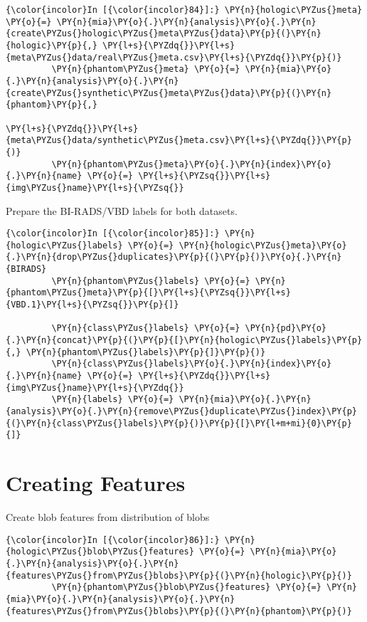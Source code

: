     \begin{Verbatim}[commandchars=\\\{\}]
{\color{incolor}In [{\color{incolor}84}]:} \PY{n}{hologic\PYZus{}meta} \PY{o}{=} \PY{n}{mia}\PY{o}{.}\PY{n}{analysis}\PY{o}{.}\PY{n}{create\PYZus{}hologic\PYZus{}meta\PYZus{}data}\PY{p}{(}\PY{n}{hologic}\PY{p}{,} \PY{l+s}{\PYZdq{}}\PY{l+s}{meta\PYZus{}data/real\PYZus{}meta.csv}\PY{l+s}{\PYZdq{}}\PY{p}{)}
         \PY{n}{phantom\PYZus{}meta} \PY{o}{=} \PY{n}{mia}\PY{o}{.}\PY{n}{analysis}\PY{o}{.}\PY{n}{create\PYZus{}synthetic\PYZus{}meta\PYZus{}data}\PY{p}{(}\PY{n}{phantom}\PY{p}{,}
                                                                \PY{l+s}{\PYZdq{}}\PY{l+s}{meta\PYZus{}data/synthetic\PYZus{}meta.csv}\PY{l+s}{\PYZdq{}}\PY{p}{)}
         \PY{n}{phantom\PYZus{}meta}\PY{o}{.}\PY{n}{index}\PY{o}{.}\PY{n}{name} \PY{o}{=} \PY{l+s}{\PYZsq{}}\PY{l+s}{img\PYZus{}name}\PY{l+s}{\PYZsq{}}
\end{Verbatim}

    Prepare the BI-RADS/VBD labels for both datasets.

    \begin{Verbatim}[commandchars=\\\{\}]
{\color{incolor}In [{\color{incolor}85}]:} \PY{n}{hologic\PYZus{}labels} \PY{o}{=} \PY{n}{hologic\PYZus{}meta}\PY{o}{.}\PY{n}{drop\PYZus{}duplicates}\PY{p}{(}\PY{p}{)}\PY{o}{.}\PY{n}{BIRADS}
         \PY{n}{phantom\PYZus{}labels} \PY{o}{=} \PY{n}{phantom\PYZus{}meta}\PY{p}{[}\PY{l+s}{\PYZsq{}}\PY{l+s}{VBD.1}\PY{l+s}{\PYZsq{}}\PY{p}{]}

         \PY{n}{class\PYZus{}labels} \PY{o}{=} \PY{n}{pd}\PY{o}{.}\PY{n}{concat}\PY{p}{(}\PY{p}{[}\PY{n}{hologic\PYZus{}labels}\PY{p}{,} \PY{n}{phantom\PYZus{}labels}\PY{p}{]}\PY{p}{)}
         \PY{n}{class\PYZus{}labels}\PY{o}{.}\PY{n}{index}\PY{o}{.}\PY{n}{name} \PY{o}{=} \PY{l+s}{\PYZdq{}}\PY{l+s}{img\PYZus{}name}\PY{l+s}{\PYZdq{}}
         \PY{n}{labels} \PY{o}{=} \PY{n}{mia}\PY{o}{.}\PY{n}{analysis}\PY{o}{.}\PY{n}{remove\PYZus{}duplicate\PYZus{}index}\PY{p}{(}\PY{n}{class\PYZus{}labels}\PY{p}{)}\PY{p}{[}\PY{l+m+mi}{0}\PY{p}{]}
\end{Verbatim}

    \section{Creating Features}\label{creating-features}

    Create blob features from distribution of blobs

    \begin{Verbatim}[commandchars=\\\{\}]
{\color{incolor}In [{\color{incolor}86}]:} \PY{n}{hologic\PYZus{}blob\PYZus{}features} \PY{o}{=} \PY{n}{mia}\PY{o}{.}\PY{n}{analysis}\PY{o}{.}\PY{n}{features\PYZus{}from\PYZus{}blobs}\PY{p}{(}\PY{n}{hologic}\PY{p}{)}
         \PY{n}{phantom\PYZus{}blob\PYZus{}features} \PY{o}{=} \PY{n}{mia}\PY{o}{.}\PY{n}{analysis}\PY{o}{.}\PY{n}{features\PYZus{}from\PYZus{}blobs}\PY{p}{(}\PY{n}{phantom}\PY{p}{)}
\end{Verbatim}

